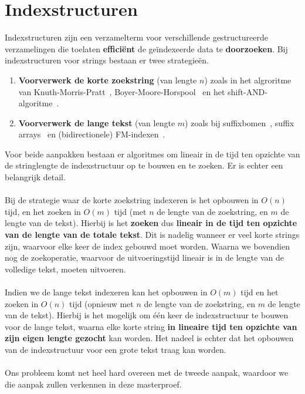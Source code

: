 \chapter{Indexstructuren}\label{ch:indexstructuren}
Indexstructuren zijn een verzamelterm voor verschillende gestructureerde verzamelingen die toelaten \textbf{efficiënt} de geïndexeerde data te \textbf{doorzoeken}.
Bij indexstructuren voor strings bestaan er twee strategieën.
\begin{enumerate}
    \item \textbf{Voorverwerk de korte zoekstring} (van lengte $n$) zoals in het algroritme van Knuth-Morris-Pratt~\cite{knuth-morris-pratt}, Boyer-Moore-Horspool~\cite{boyer-moore-horspool} en het shift-AND-algoritme~\cite{shift-and}.
    \item \textbf{Voorverwerk de lange tekst} (van lengte $m$) zoals bij suffixbomen~\cite{mcCreight_first_suffixtree}, suffix arrays~\cite{suffix_array_first_mention} en (bidirectionele) FM-indexen~\cite{fm_index, bi-directional_fm_index}.
\end{enumerate}
Voor beide aanpakken bestaan er algoritmes om lineair in de tijd ten opzichte van de stringlengte de indexstructuur op te bouwen en te zoeken.
Er is echter een belangrijk detail.
\\ \\
Bij de strategie waar de korte zoekstring indexeren is het opbouwen in $O(n)$ tijd, en het zoeken in $O(m)$ tijd (met $n$ de lengte van de zoekstring, en $m$ de lengte van de tekst).
Hierbij is het \textbf{zoeken} dus \textbf{lineair in de tijd ten opzichte van de lengte van de totale tekst}.
Dit is nadelig wanneer er veel korte strings zijn, waarvoor elke keer de index gebouwd moet worden.
Waarna we bovendien nog de zoekoperatie, waarvoor de uitvoeringstijd lineair is in de lengte van de volledige tekst, moeten uitvoeren.
\\ \\
Indien we de lange tekst indexeren kan het opbouwen in $O(m)$ tijd en het zoeken in $O(n)$ tijd (opnieuw met $n$ de lengte van de zoekstring, en $m$ de lengte van de tekst).
Hierbij is het mogelijk om één keer de indexstructuur te bouwen voor de lange tekst, waarna elke korte string \textbf{in lineaire tijd ten opzichte van zijn eigen lengte gezocht} kan worden.
Het nadeel is echter dat het opbouwen van de indexstructuur voor een grote tekst traag kan worden.
\\ \\
Ons probleem komt net heel hard overeen met de tweede aanpak, waardoor we die aanpak zullen verkennen in deze masterproef.

